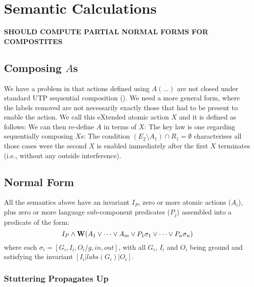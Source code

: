 \section{Semantic Calculations}\label{sec:calc}

\textbf{SHOULD COMPUTE PARTIAL NORMAL FORMS
FOR COMPOSTITES}

\subsection{Composing $A$s}\label{ssec:comp-A}

We have a problem in that actions defined using $A(\dots)$
are not closed under standard UTP sequential composition ().
We need a more general form,
where the labels removed are not necessarily
exactly those that had to be present to enable the action.
We call this eXtended atomic action $X$ and it is defined as follows:
We can then re-define $A$ in terms of $X$:
The key law is one regarding sequentially composing $X$s:
The condition $(E_2\setminus A_1) \cap R_1 = \emptyset$
characterises all those cases were the second $X$ is enabled
immediately after the first $X$ terminates
(i.e., without any outside interference).

\subsection{Normal Form}\label{sec:normal-form}

All the semantics above have an invariant $I_P$,
zero or more atomic actions ($A_i$),
plus zero or more language sub-component predicates ($P_j$)
assembled into a predicate of the form:
\[
  I_P
  \land
  \mathbf{W}( A_1 \lor \dots \lor A_m
     \lor
     P_1\sigma_1 \lor \dots \lor P_n\sigma_n )
\]
where each $\sigma_i = [G_i,I_i,O_i/g,in,out]$,
with all $G_i$, $I_i$ and $O_i$ being ground
and satisfying the invariant $[I_i|labs(G_i)|O_i]$.

\subsubsection{Stuttering Propagates Up}

